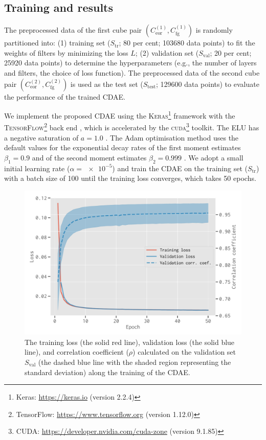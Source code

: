\documentclass[fleqn,usenatbib]{mnras}
\newlength{\myfigwidth}
\newcommand{\R}[1]{\mathrm{#1}}
\newcommand{\editwip}[1]{{\leavevmode\color{magenta}#1}}
\begin{document}
\subsection{Training and results}
\label{sec:results}

\editwip{%
The preprocessed data of the first cube pair
$\left( C_{\R{eor}}^{(1)}, C_{\R{fg}}^{(1)} \right)$
is randomly partitioned into:
(1) training set ($S_{\R{tr}}$; 80 per cent; \num{103680} data points)
to fit the weights of filters by minimizing the loss $L$;
(2) validation set ($S_{\R{val}}$; 20 per cent; \num{25920} data points)
to determine the hyperparameters (e.g., the number of layers and filters,
the choice of loss function).
The preprocessed data of the second cube pair
$\left( C_{\R{eor}}^{(2)}, C_{\R{fg}}^{(2)} \right)$
is used as the test set ($S_{\R{test}}$; \num{129600} data points) to
evaluate the performance of the trained CDAE.} %

We implement the proposed CDAE using the
\textsc{Keras}\footnote{Keras: \url{https://keras.io}
  (\editwip{version 2.2.4})}
framework \citep{keras} with the
\textsc{TensorFlow}\footnote{TensorFlow:
  \url{https://www.tensorflow.org} (\editwip{version 1.12.0})}
back end \citep{tensorflow},
\editwip{%
which is accelerated by the \textsc{cuda}\footnote{\raggedright%
  CUDA: \url{https://developer.nvidia.com/cuda-zone} (version 9.1.85)}
toolkit.
The ELU has a negative saturation of $a = 1.0$ \citep{clevert2016}.
The Adam optimisation method uses the default values for the exponential
decay rates of the first moment estimates $\beta_1 = 0.9$ and of the
second moment estimates $\beta_2 = 0.999$ \citep{kingma2015}.
We adopt a small initial learning rate ($\alpha = \num{e-5}$) and train the
CDAE on the training set ($S_{\R{tr}}$) with a batch size of 100 until the
training loss converges, which takes 50 epochs.
} %

\begin{figure}
  \centering
  \includegraphics[width=\myfigwidth]{cdae-train}
  \caption{\label{fig:train}%
    The training loss (the solid red line), validation loss (the solid blue
    line), and correlation coefficient ($\rho$) calculated on the
    validation set $S_{\R{val}}$ (the \editwip{dashed blue} line with the
    shaded region representing the standard deviation) along the training
    of the CDAE.
  }
\end{figure}
\end{document}

